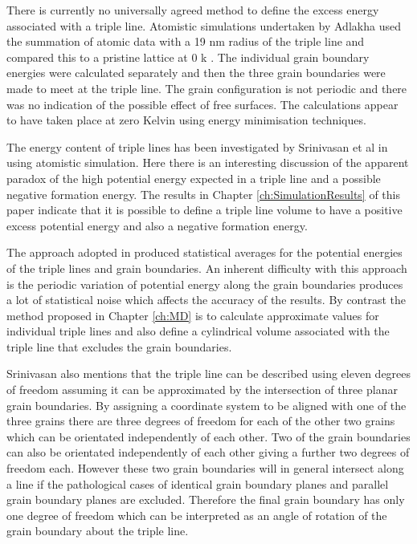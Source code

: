 \documentclass[12pt,a4paper,openany]{report}
\begin{document}
There is currently no universally agreed method to define the excess energy associated with a triple line. Atomistic simulations undertaken by Adlakha used the summation of atomic data with a 19 nm radius of the triple line and compared this to a pristine lattice at 0 k \cite{Adlakha2015}. The individual grain boundary energies were calculated separately and then the three grain boundaries were made to meet at the triple line. The grain configuration is not periodic and there was no indication of the possible effect of free surfaces. The calculations appear to have taken place at zero Kelvin using energy minimisation techniques. 

The energy content of triple lines has been investigated by Srinivasan et al in \cite{Srinivasan1999} using atomistic simulation. Here there is an interesting discussion of the apparent paradox of the high potential energy expected in a triple line and a possible negative formation energy. The results in Chapter \ref{ch:SimulationResults} of this paper indicate that it is possible to define a triple line volume to have a positive excess potential energy and also a negative formation energy. 

The approach adopted in \cite{Srinivasan1999}   
produced statistical averages for the potential energies of the triple lines and grain boundaries. An inherent difficulty with this approach is the periodic variation of potential energy along the grain boundaries produces a lot of statistical noise which affects the accuracy of the results. By contrast the method proposed in Chapter \ref{ch:MD} is to calculate approximate values for individual triple lines and also define a cylindrical volume associated with the triple line that excludes the grain boundaries.

Srinivasan also mentions that the triple line can be described using eleven degrees of freedom assuming it can be approximated by the intersection of three planar grain boundaries. By assigning a coordinate system to be aligned with one of the three grains there are three degrees of freedom for each of the other two grains which can be orientated independently of each other. Two of the grain boundaries can also be orientated independently of each other giving a further two degrees of freedom each. However these two grain boundaries will in general intersect along a line if the pathological cases of identical grain boundary planes and parallel grain boundary planes are excluded. Therefore the final grain boundary has only one degree of freedom which can be interpreted as an angle of rotation of the grain boundary about the triple line.
\end{document}
